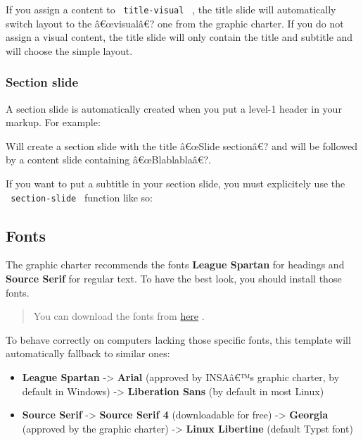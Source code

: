 If you assign a content to \texttt{\ title-visual\ } , the title slide
will automatically switch layout to the â€œvisualâ€? one from the
graphic charter. If you do not assign a visual content, the title slide
will only contain the title and subtitle and will choose the simple
layout.

\subsubsection{Section slide}\label{section-slide}

A section slide is automatically created when you put a level-1 header
in your markup. For example:

\begin{Shaded}
\begin{Highlighting}[]
\end{Highlighting}
\end{Shaded}

Will create a section slide with the title â€œSlide sectionâ€? and will
be followed by a content slide containing â€œBlablablaâ€?.

If you want to put a subtitle in your section slide, you must
explicitely use the \texttt{\ section-slide\ } function like so:

\begin{Shaded}
\begin{Highlighting}[]
\end{Highlighting}
\end{Shaded}

\subsection{Fonts}\label{fonts}

The graphic charter recommends the fonts \textbf{League Spartan} for
headings and \textbf{Source Serif} for regular text. To have the best
look, you should install those fonts.

\begin{quote}
You can download the fonts from
\href{https://github.com/SkytAsul/INSA-Typst-Template/tree/main/fonts}{here}
.
\end{quote}

To behave correctly on computers lacking those specific fonts, this
template will automatically fallback to similar ones:

\begin{itemize}
\tightlist
\item
  \textbf{League Spartan} -\textgreater{} \textbf{Arial} (approved by
  INSAâ€™s graphic charter, by default in Windows) -\textgreater{}
  \textbf{Liberation Sans} (by default in most Linux)
\item
  \textbf{Source Serif} -\textgreater{} \textbf{Source Serif 4}
  (downloadable for free) -\textgreater{} \textbf{Georgia} (approved by
  the graphic charter) -\textgreater{} \textbf{Linux Libertine} (default
  Typst font)
\end{itemize}

